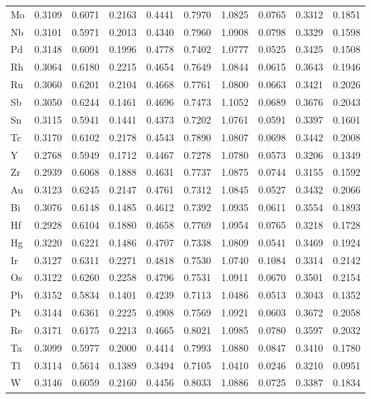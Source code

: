 \documentclass[a4paper, 12pt]{article}
\begin{document}
\begin{table}[htbp]
{\begin{tabular}{l *{9}{l}}
      Mo & 0.3109 & 0.6071 & 0.2163 & 0.4441 & 0.7970 & 1.0825 & 0.0765 & 0.3312 & 0.1851 \\
      Nb & 0.3101 & 0.5971 & 0.2013 & 0.4340 & 0.7960 & 1.0908 & 0.0798 & 0.3329 & 0.1598 \\
      Pd & 0.3148 & 0.6091 & 0.1996 & 0.4778 & 0.7402 & 1.0777 & 0.0525 & 0.3425 & 0.1508 \\
      Rh & 0.3064 & 0.6180 & 0.2215 & 0.4654 & 0.7649 & 1.0844 & 0.0615 & 0.3643 & 0.1946 \\
      Ru & 0.3060 & 0.6201 & 0.2104 & 0.4668 & 0.7761 & 1.0800 & 0.0663 & 0.3421 & 0.2026 \\
      Sb & 0.3050 & 0.6244 & 0.1461 & 0.4696 & 0.7473 & 1.1052 & 0.0689 & 0.3676 & 0.2043 \\
      Sn & 0.3115 & 0.5941 & 0.1441 & 0.4373 & 0.7202 & 1.0761 & 0.0591 & 0.3397 & 0.1601 \\
      Tc & 0.3170 & 0.6102 & 0.2178 & 0.4543 & 0.7890 & 1.0807 & 0.0698 & 0.3442 & 0.2008 \\
      Y  & 0.2768 & 0.5949 & 0.1712 & 0.4467 & 0.7278 & 1.0780 & 0.0573 & 0.3206 & 0.1349 \\
      Zr & 0.2939 & 0.6068 & 0.1888 & 0.4631 & 0.7737 & 1.0875 & 0.0744 & 0.3155 & 0.1592 \\
      Au & 0.3123 & 0.6245 & 0.2147 & 0.4761 & 0.7312 & 1.0845 & 0.0527 & 0.3432 & 0.2066 \\
      Bi & 0.3076 & 0.6148 & 0.1485 & 0.4612 & 0.7392 & 1.0935 & 0.0611 & 0.3554 & 0.1893 \\
      Hf & 0.2928 & 0.6104 & 0.1880 & 0.4658 & 0.7769 & 1.0954 & 0.0765 & 0.3218 & 0.1728 \\
      Hg & 0.3220 & 0.6221 & 0.1486 & 0.4707 & 0.7338 & 1.0809 & 0.0541 & 0.3469 & 0.1924 \\
      Ir & 0.3127 & 0.6311 & 0.2271 & 0.4818 & 0.7530 & 1.0740 & 0.1084 & 0.3314 & 0.2142 \\
      Os & 0.3122 & 0.6260 & 0.2258 & 0.4796 & 0.7531 & 1.0911 & 0.0670 & 0.3501 & 0.2154 \\
      Pb & 0.3152 & 0.5834 & 0.1401 & 0.4239 & 0.7113 & 1.0486 & 0.0513 & 0.3043 & 0.1352 \\
      Pt & 0.3144 & 0.6361 & 0.2225 & 0.4908 & 0.7569 & 1.0921 & 0.0603 & 0.3672 & 0.2058 \\
      Re & 0.3171 & 0.6175 & 0.2213 & 0.4665 & 0.8021 & 1.0985 & 0.0780 & 0.3597 & 0.2032 \\
      Ta & 0.3099 & 0.5977 & 0.2000 & 0.4414 & 0.7993 & 1.0880 & 0.0847 & 0.3410 & 0.1780 \\
      Tl & 0.3114 & 0.5614 & 0.1389 & 0.3494 & 0.7105 & 1.0410 & 0.0246 & 0.3210 & 0.0951 \\
      W  & 0.3146 & 0.6059 & 0.2160 & 0.4456 & 0.8033 & 1.0886 & 0.0725 & 0.3387 & 0.1834 \\
      \bottomrule
    \end{tabular}
  }
\end{table}
\end{document}
